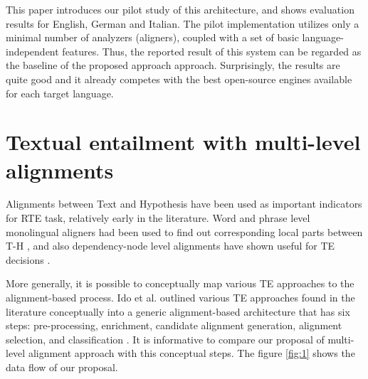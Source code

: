 \documentclass[11pt,letterpaper]{article}
\begin{document}
This paper introduces our pilot study of this architecture, and shows
evaluation results for English, German and Italian. The pilot
implementation utilizes only a minimal number of analyzers (aligners),
coupled with a set of basic language-independent features. Thus, the 
reported result of this system can be regarded as the baseline of the
proposed approach approach. Surprisingly, the results are quite good
and it already competes with the best open-source engines available
for each target language. 

\section{Textual entailment with multi-level alignments}
Alignments between Text and Hypothesis have been used as important
indicators for RTE task, relatively early in the literature. Word and
phrase level monolingual aligners had been used to find out
corresponding local parts between T-H \cite{}, and also
dependency-node level alignments have shown useful for TE decisions
\cite{}.      

More generally, it is possible to conceptually map various TE
approaches to the alignment-based process. Ido et al. outlined various
TE approaches found in the literature conceptually into a generic
alignment-based architecture that has six steps: pre-processing,
enrichment, candidate alignment generation, alignment selection, and
classification \cite{}.   
It is informative to compare our proposal of multi-level alignment 
approach with this conceptual steps. The figure \ref{fig:1} shows the
data flow of our proposal. 
\end{document}
